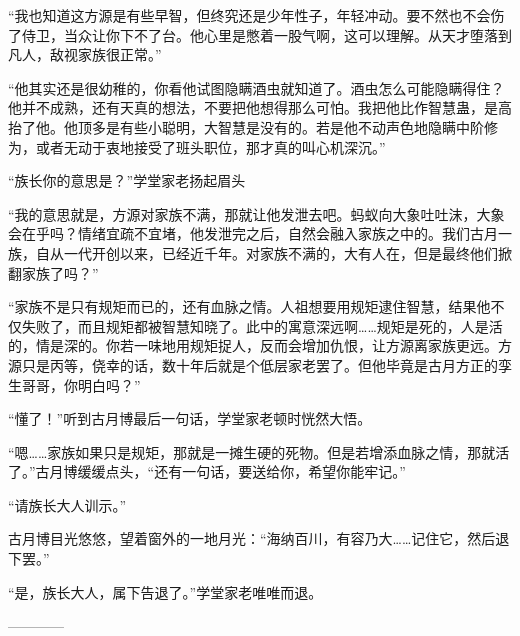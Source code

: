 \begin{this_body}
“我也知道这方源是有些早智，但终究还是少年性子，年轻冲动。要不然也不会伤了侍卫，当众让你下不了台。他心里是憋着一股气啊，这可以理解。从天才堕落到凡人，敌视家族很正常。”

“他其实还是很幼稚的，你看他试图隐瞒酒虫就知道了。酒虫怎么可能隐瞒得住？他并不成熟，还有天真的想法，不要把他想得那么可怕。我把他比作智慧蛊，是高抬了他。他顶多是有些小聪明，大智慧是没有的。若是他不动声色地隐瞒中阶修为，或者无动于衷地接受了班头职位，那才真的叫心机深沉。”

“族长你的意思是？”学堂家老扬起眉头

“我的意思就是，方源对家族不满，那就让他发泄去吧。蚂蚁向大象吐吐沫，大象会在乎吗？情绪宜疏不宜堵，他发泄完之后，自然会融入家族之中的。我们古月一族，自从一代开创以来，已经近千年。对家族不满的，大有人在，但是最终他们掀翻家族了吗？”

“家族不是只有规矩而已的，还有血脉之情。人祖想要用规矩逮住智慧，结果他不仅失败了，而且规矩都被智慧知晓了。此中的寓意深远啊……规矩是死的，人是活的，情是深的。你若一味地用规矩捉人，反而会增加仇恨，让方源离家族更远。方源只是丙等，侥幸的话，数十年后就是个低层家老罢了。但他毕竟是古月方正的孪生哥哥，你明白吗？”

“懂了！”听到古月博最后一句话，学堂家老顿时恍然大悟。

“嗯……家族如果只是规矩，那就是一摊生硬的死物。但是若增添血脉之情，那就活了。”古月博缓缓点头，“还有一句话，要送给你，希望你能牢记。”

“请族长大人训示。”

古月博目光悠悠，望着窗外的一地月光：“海纳百川，有容乃大……记住它，然后退下罢。”

“是，族长大人，属下告退了。”学堂家老唯唯而退。

------------

\end{this_body}

